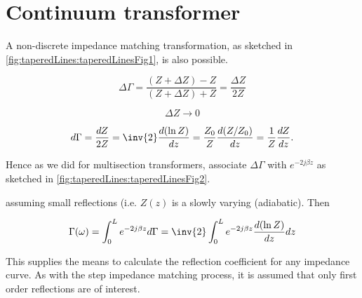 %
%
\section{Continuum transformer}

A non-discrete impedance matching transformation, as sketched in \cref{fig:taperedLines:taperedLinesFig1}, is also possible.


\begin{equation}\label{eqn:continuumAndOtherTransformersCore:820}
\Delta \Gamma 
= \frac{ (Z + \Delta Z) - Z }{(Z + \Delta Z) + Z} 
= \frac{\Delta Z}{2 Z}
\end{equation}

\begin{equation}\label{eqn:continuumAndOtherTransformersCore:840}
\Delta Z \rightarrow 0
\end{equation}

\begin{dmath}\label{eqn:continuumAndOtherTransformersCore:860}
d\Gamma 
= \frac{dZ}{2 Z} 
= \inv{2} \frac{d (\ln Z)}{dz}
= \frac{Z_0}{Z} \frac{d (Z/Z_0)}{dz}
= \frac{1}{Z} \frac{d Z}{dz}.
\end{dmath}

Hence as we did for multisection transformers, associate \( \Delta \Gamma \) with \( e^{- 2j \beta z} \) as sketched in \cref{fig:taperedLines:taperedLinesFig2}.


assuming small reflections (i.e. \( Z(z) \) is a slowly varying (adiabatic).  Then

\begin{dmath}\label{eqn:continuumAndOtherTransformersCore:920}
\Gamma(\omega) 
= \int_0^L e^{ -2 j \beta z} d\Gamma
= \inv{2} 
\int_0^L e^{ -2 j \beta z}  \frac{d (\ln Z)}{dz} dz
\end{dmath}

This supplies the means to calculate the reflection coefficient for any impedance curve.  As with the step impedance matching process, it is assumed that only first order reflections are of interest.

